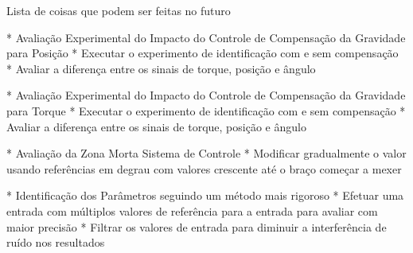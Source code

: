 Lista de coisas que podem ser feitas no futuro

* Avaliação Experimental do Impacto do Controle de Compensação da Gravidade para Posição
  * Executar o experimento de identificação com e sem compensação
  * Avaliar a diferença entre os sinais de torque, posição e ângulo
 
* Avaliação Experimental do Impacto do Controle de Compensação da Gravidade para Torque
  * Executar o experimento de identificação com e sem compensação
  * Avaliar a diferença entre os sinais de torque, posição e ângulo

* Avaliação da Zona Morta Sistema de Controle
 * Modificar gradualmente o valor usando referências em degrau com valores crescente até o braço começar a mexer
 
* Identificação dos Parâmetros seguindo um método mais rigoroso
 * Efetuar uma entrada com múltiplos valores de referência para a entrada para avaliar com maior precisão
 * Filtrar os valores de entrada para diminuir a interferência de ruído nos resultados